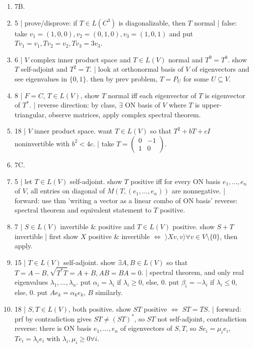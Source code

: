 \begin{enumerate}
	\item 7B. 
	\item 5 | prove/disprove: if $T \in L(C^3)$ is diagonalizable, then $T$ normal | false: take $v_1 = (1,0,0), v_2 = (0,1,0), v_3 = (1,0,1)$ and put $Tv_1 = v_1, Tv_2 = v_2, Tv_3 = 3v_3$. 
	\item 6 | $V$ complex inner product space and $T \in L(V)$ normal and $T^9=T^8$. show $T$ self-adjoint and $T^2=T$. | look at orthonormal basis of $V$ of eigenvectors and see eigenvalues in $\{0,1\}$. then by prev problem, $T=P_U$ for some $U \subseteq V$. 
	\item 8 | $F=C$, $T \in L(V)$, show $T$ normal iff each eigenvector of $T$ is eigenvector of $T^*$. | reverse direction: by class, $\exists$ ON basis of $V$ where $T$ is upper-triangular, observe matrices, apply complex spectral theorem. 
	\item 18 | $V$ inner product space. want $T \in L(V)$ so that $T^2 + bT + cI$ noninvertible with $b^2 < 4c$. | take $T = \begin{pmatrix} 0 & -1 \\ 1 & 0 \end{pmatrix}$. 
	\item 7C. 
	\item 5 | let $T \in L(V)$ self-adjoint. show $T$ positive iff for every ON basis $e_1,\dots,e_n$ of $V$, all entries on diagonal of $M(T,(e_1,\dots,e_n))$ are nonnegative. | forward: use thm 'writing a vector as a linear combo of ON basis' reverse: spectral theorem and equivalent statement to $T$ positive. 
	\item 7 | $S \in L(V)$ invertible \& positive and $T \in L(V)$ positive. show $S+T$ invertible | first show $X$ positive \& invertible $\iff$ $\rangle Xv,v \rangle \forall v \in V \setminus \{0\}$, then apply. 
	\item 15 | $T \in L(V)$ self-adjoint. show $\exists A,B \in L(V)$ so that $T=A-B, \sqrt{T^*T} = A+B, AB=BA=0$. | spectral theorem, and only real eigenvalues $\lambda_1,\dots,\lambda_n$. put $\alpha_i = \lambda_i$ if $\lambda_i \geq 0$, else, 0. put $\beta_i = -\lambda_i$ if $\lambda_i \leq 0$, else, 0. put $Ae_k = \alpha_ke_k$, $B$ similarly. 
	\item 18 | $S,T \in L(V)$, both positive. show $ST$ positive $\iff$ $ST=TS$. | forward: prf by contradiction gives $ST \neq (ST)^*$, so $ST$ not self-adjoint, contradiction reverse: there is ON basis $e_1,\dots,e_n$ of eigenvectors of $S,T$, so $Se_i = \mu_ie_i$, $Te_i = \lambda_ie_i$ with $\lambda_i,\mu_i \geq 0 \forall i$. 

\end{enumerate}
